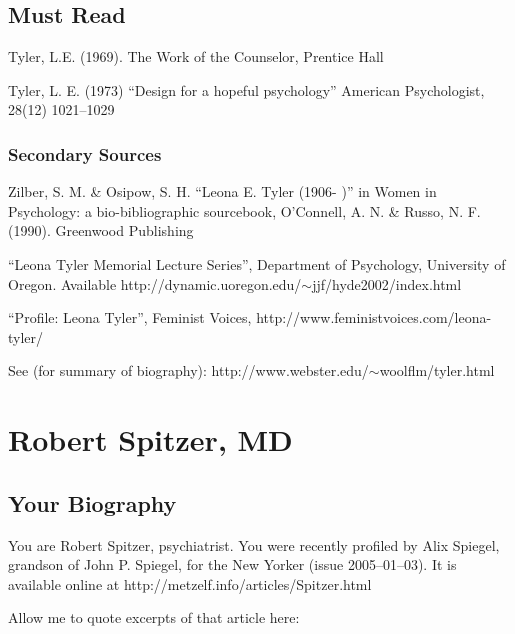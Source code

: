 \begin{refsection}
\section{Must Read}
\label{mustread}

Tyler, L.E. (1969). The Work of the Counselor, Prentice Hall

Tyler, L. E. (1973) ``Design for a hopeful psychology'' American Psychologist, 28(12) 1021--1029

\subsection{Secondary Sources}
\label{secondarysources}

Zilber, S. M. \& Osipow, S. H. ``Leona E. Tyler (1906- )'' in Women in Psychology: a bio-bibliographic sourcebook, O'Connell, A. N. \& Russo, N. F. (1990). Greenwood Publishing

``Leona Tyler Memorial Lecture Series'', Department of Psychology, University of Oregon. Available http:\slash \slash dynamic.uoregon.edu\slash \ensuremath{\sim}jjf\slash hyde2002\slash index.html

``Profile: Leona Tyler'', Feminist Voices, http:\slash \slash www.feministvoices.com\slash leona-tyler\slash 

See (for summary of biography): http:\slash \slash www.webster.edu\slash \ensuremath{\sim}woolflm\slash tyler.html

\chapter{Robert Spitzer, MD}
\label{robertspitzermd}

\section{Your Biography}
\label{yourbiography}

You are Robert Spitzer, psychiatrist. You were recently profiled by Alix Spiegel, grandson of John P. Spiegel, for the New Yorker (issue 2005--01--03). It is available online at http:\slash \slash metzelf.info\slash articles\slash Spitzer.html

Allow me to quote excerpts of that article here:

\begin{quote}


\end{quote}
\end{refsection}
